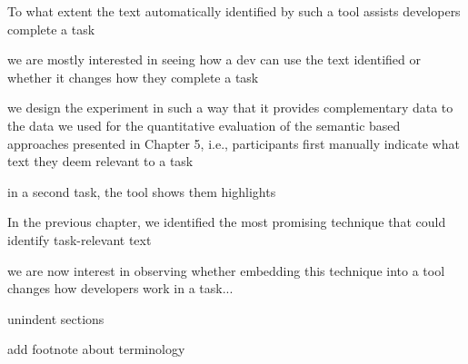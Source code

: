 






















\clearpage



To what extent the text automatically identified by such a tool assists developers complete a task


we are mostly interested in seeing how a dev can use the text identified or whether it changes how they complete a task



we design the experiment in such a way that it provides complementary data to the data we used for the quantitative evaluation 
of the semantic based approaches presented in Chapter 5, i.e., participants first manually indicate what text they deem relevant to a task

in a second task, the tool shows them highlights



In the previous chapter, we identified the most promising technique that could identify task-relevant text 


we are now interest in observing whether embedding this technique into a tool changes how developers work in a task...



unindent sections


add footnote about terminology


